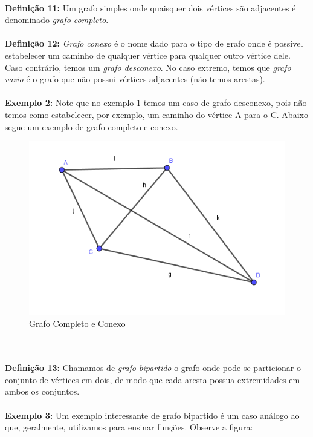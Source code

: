 \documentclass[a4paper,12pt]{article}
\begin{document}
	\\
	\textbf{Definição 11: }Um grafo simples onde quaisquer dois vértices são adjacentes é denominado \textit{grafo completo}.
	\\
	\\
	\textbf{Definição 12: }\textit{Grafo conexo} é o nome dado para o tipo de grafo onde é possível estabelecer um caminho de qualquer vértice para qualquer outro vértice dele. Caso contrário, temos um \textit{grafo desconexo}. No caso extremo, temos que \textit{grafo vazio} é o grafo que não possui vértices adjacentes (não temos arestas).
	\\
	\\
	\textbf{Exemplo 2: }Note que no exemplo 1 temos um caso de grafo desconexo, pois não temos como estabelecer, por exemplo, um caminho do vértice A para o C. Abaixo segue um exemplo de grafo completo e conexo.
	\begin{figure}[h]
		\center
		\includegraphics[width=0.6\linewidth]{Grafocompleto.png}
		\caption{Grafo Completo e Conexo}
		\label{}
	\end{figure}
	\\
	\\
	\textbf{Definição 13: }Chamamos de \textit{grafo bipartido} o grafo onde pode-se particionar o conjunto de vértices em dois, de modo que cada aresta possua extremidades em ambos os conjuntos.
	\\
	\\
	\textbf{Exemplo 3: }Um exemplo interessante de grafo bipartido é um caso análogo ao que, geralmente, utilizamos para ensinar funções. Observe a figura:
	\vspace{0.5cm}
	
	\begin{minipage}{\linewidth}%
		\label{}%
	\end{minipage}
	
\end{document}
